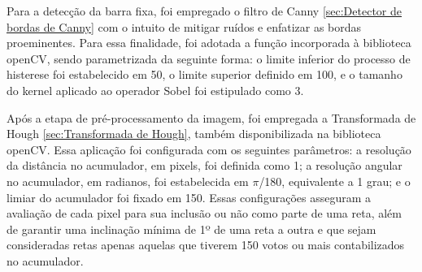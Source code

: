 Para a detecção da barra fixa, foi empregado o filtro de Canny \ref{sec:Detector de bordas de Canny} com o intuito de mitigar ruídos e enfatizar as bordas proeminentes. Para essa finalidade, foi adotada a função incorporada à biblioteca \ac{openCV}, sendo parametrizada da seguinte forma: o limite inferior do processo de histerese foi estabelecido em 50, o limite superior definido em 100, e o tamanho do kernel aplicado ao operador Sobel foi estipulado como 3.

Após a etapa de pré-processamento da imagem, foi empregada a Transformada de Hough \ref{sec:Transformada de Hough}, também disponibilizada na biblioteca \ac{openCV}. Essa aplicação foi configurada com os seguintes parâmetros: a resolução da distância no acumulador, em pixels, foi definida como 1; a resolução angular no acumulador, em radianos, foi estabelecida em $\pi$/180, equivalente a 1 grau; e o limiar do acumulador foi fixado em 150. Essas configurações asseguram a avaliação de cada pixel para sua inclusão ou não como parte de uma reta, além de garantir uma inclinação mínima de 1º de uma reta a outra e que sejam consideradas retas apenas aquelas que tiverem 150 votos ou mais contabilizados no acumulador.

